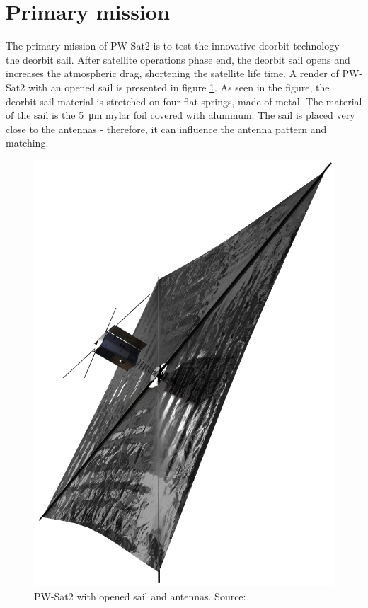 \section{Primary mission}
The primary mission of PW-Sat2 is to test the innovative deorbit technology - the deorbit sail. After satellite operations phase end, the deorbit sail opens and increases the atmospheric drag, shortening the satellite life time. A render of PW-Sat2 with an opened sail is presented in figure \ref{PW-Sat_render_sail}. As seen in the figure, the deorbit sail material is stretched on four flat springs, made of metal. The material of the sail is the \SI{5}{\micro\meter} mylar foil covered with aluminum. The sail is placed very close to the antennas - therefore, it can influence the antenna pattern and matching. 
\begin{figure}[h]
    \centering
    \includegraphics[width=0.38\paperwidth]{img/3/PW-Sat2_render_02.png}
    \caption{PW-Sat2 with opened sail and antennas. Source: \cite{PW_sat2_photo}}
    \label{PW-Sat_render_sail}
\end{figure}


